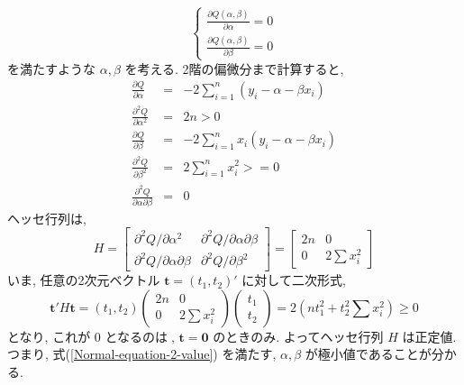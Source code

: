 \documentclass{jsarticle}
\theoremstyle{plain}
\begin{document}
  \begin{equation}
  \label{Normal-equation-2-value}
    \begin{cases}
      \frac{\partial Q(\alpha, \beta)}{\partial \alpha} = 0 \\
      \frac{\partial Q(\alpha, \beta)}{\partial \beta} = 0
    \end{cases}
  \end{equation}
  を満たすような $\alpha, \beta$ を考える. 2階の偏微分まで計算すると,
  \begin{eqnarray}
    \frac{\partial Q}{\partial \alpha} &=& -2 \sum_{i=1}^n (y_i - \alpha - \beta x_i) \\
    \frac{\partial^2 Q}{\partial \alpha^2} &=& 2n > 0 \\
    \frac{\partial Q}{\partial \beta} &=& -2\sum_{i=1}^n x_i (y_i - \alpha - \beta x_i) \\
    \frac{\partial^2 Q}{\partial \beta^2} &=& 2 \sum_{i=1}^n x_i^2 >= 0 \\
    \frac{\partial^2 Q}{\partial \alpha \partial \beta} &=& 0
  \end{eqnarray}
  ヘッセ行列は,
  \begin{equation}
    H = 
    \left[
      \begin{array}{cc}
        \partial^2 Q / \partial \alpha^2 & \partial^2 Q/\partial \alpha \partial \beta \\
        \partial^2 Q/\partial \alpha \partial \beta & \partial^2 Q / \partial \beta^2
      \end{array}
    \right]
    = \left[
      \begin{array}{cc}
        2n & 0 \\
        0 & 2 \sum x_i^2
      \end{array}
    \right]
  \end{equation}
  いま, 任意の2次元ベクトル $\bm{t} = (t_1, t_2)'$ に対して二次形式,
  \begin{equation}
    \bm{t}'H\bm{t} = (t_1, t_2) \left(
      \begin{array}{cc}
        2n & 0 \\
        0 & 2 \sum x_i^2
      \end{array}
    \right) \left( 
      \begin{array}{c}
        t_1 \\
        t_2
      \end{array}
    \right) = 2\left(nt_1^2 + t_2^2 \sum x_i^2 \right) \geq 0
  \end{equation}
  となり, これが $0$ となるのは, $\bm{t}=\bm{0}$ のときのみ. よってヘッセ行列 $H$ は正定値. つまり, 式(\ref{Normal-equation-2-value}) を満たす,
  $\alpha, \beta$ が極小値であることが分かる.
  \appendix
\end{document}
